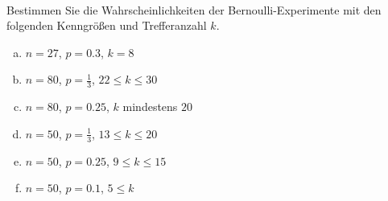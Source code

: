 \begin{aufgabe} ~ \\ 
Bestimmen Sie die Wahrscheinlichkeiten der Bernoulli-Experimente mit den folgenden Kenngrößen und Trefferanzahl $k$.\begin{multicols}{2} 
\begin{enumerate}[a)] 
\item 
$n=27$, $p=0.3$, $k=8$
\item 
$n=80$, $p=\frac{1}{3}$, $22\leq k \leq 30$
\item 
$n=80$, $p=0.25$, $k$ mindestens $20$
\item 
$n=50$, $p=\frac{1}{3}$, $13\leq k \leq 20$
\item 
$n=50$, $p=0.25$, $9\leq k \leq 15$
\item 
$n=50$, $p=0.1$, $5\leq k $
\end{enumerate} 
\end{multicols} 
\end{aufgabe} 
